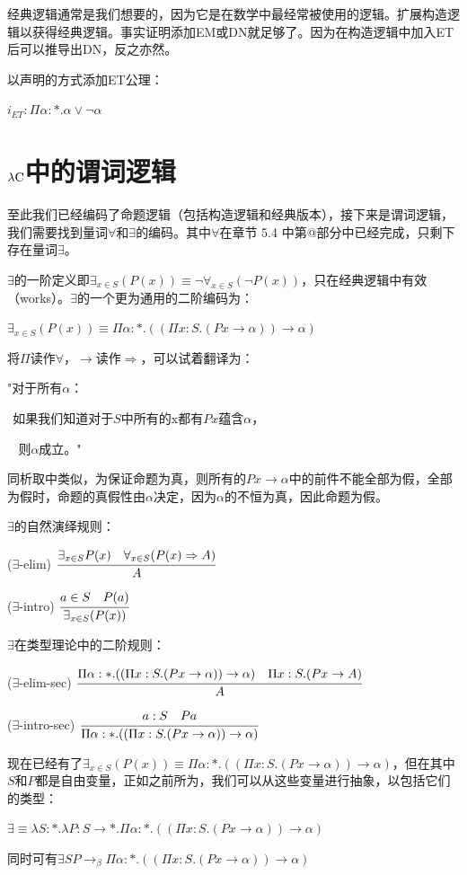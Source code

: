 \documentclass[UTF8]{article}
\makeatletter
\newcommand{\Rmnum}[1]{\expandafter\@slowromancap\romannumeral #1@}
\makeatother
\begin{document}
		经典逻辑通常是我们想要的，因为它是在数学中最经常被使用的逻辑。扩展构造逻辑以获得经典逻辑。事实证明添加EM或DN就足够了。因为在构造逻辑中加入ET后可以推导出DN，反之亦然。
		
		以声明的方式添加ET公理：
		
		$i_{ET}:\Pi\alpha:*.\alpha\lor\neg\alpha$
		
	\section{$\lambda{\rm C}$中的谓词逻辑}
	\noindent
	至此我们已经编码了命题逻辑（包括构造逻辑和经典版本），接下来是谓词逻辑，我们需要找到量词$\forall$和$\exists$的编码。其中$\forall$在章节 5.4 中第\Rmnum{5}部分中已经完成，只剩下存在量词$\exists$。
	
		$\exists$的一阶定义即$\exists_{x\in S}(P(x))\equiv\neg\forall_{x\in S}(\neg P(x))$，只在经典逻辑中有效（works）。$\exists$的一个更为通用的二阶编码为：
		
		$\exists_{x\in S}(P(x))\equiv\Pi\alpha:*.((\Pi x:S.(Px\rightarrow\alpha))\rightarrow\alpha)$
		
		将$\Pi$读作$\forall$，$\rightarrow$读作$\Rightarrow$，可以试着翻译为：
		
		"对于所有$\alpha$：
		
		$\ \ $如果我们知道对于$S$中所有的x都有$Px$蕴含$\alpha$，
		
		$\ \ \ \ $则$\alpha$成立。"
		
		同析取中类似，为保证命题为真，则所有的$Px\rightarrow \alpha$中的前件不能全部为假，全部为假时，命题的真假性由$\alpha$决定，因为$\alpha$的不恒为真，因此命题为假。
		
		$\exists$的自然演绎规则：
		
		($\exists$-elim) $\cfrac{\exists_{x\in S}P(x)\ \ \ \forall_{x\in S}(P(x)\Rightarrow A)}{A}$
		
		($\exists$-intro) $\cfrac{a\in S\ \ \ P(a)}{\exists_{x\in S}(P(x))}$
		
		$\exists$在类型理论中的二阶规则：
		
		($\exists$-elim-sec) $\cfrac{\Pi\alpha:*.((\Pi x:S.(Px\rightarrow\alpha))\rightarrow\alpha)\ \ \ \Pi x:S.(Px\rightarrow A)}{A}$
		
		($\exists$-intro-sec) $\cfrac{a:S\ \ \ Pa}{\Pi\alpha:*.((\Pi x:S.(Px\rightarrow\alpha))\rightarrow\alpha)}$
		
		现在已经有了$\exists_{x\in S}(P(x))\equiv\Pi\alpha:*.((\Pi x:S.(Px\rightarrow\alpha))\rightarrow\alpha)$，但在其中$S$和$P$都是自由变量，正如之前所为，我们可以从这些变量进行抽象，以包括它们的类型：
		
		$\exists\equiv\lambda S:*.\lambda P:S\rightarrow *.\Pi\alpha:*.((\Pi x:S.(Px\rightarrow\alpha))\rightarrow\alpha)$
		
		同时可有$\exists SP\rightarrow_\beta\Pi\alpha:*.((\Pi x:S.(Px\rightarrow\alpha))\rightarrow\alpha)$
\end{document}
